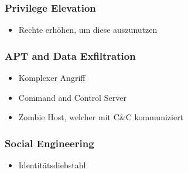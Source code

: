 \subsubsection{Privilege Elevation}
\begin{itemize}
    \item Rechte erhöhen, um diese auszunutzen
\end{itemize}

\subsubsection{APT and Data Exfiltration}
\begin{itemize}
    \item Komplexer Angriff
    \item Command and Control Server
    \item Zombie Host, welcher mit C\&C kommuniziert
\end{itemize}

\subsubsection{Social Engineering}
\begin{itemize}
    \item Identitätsdiebstahl
\end{itemize}

